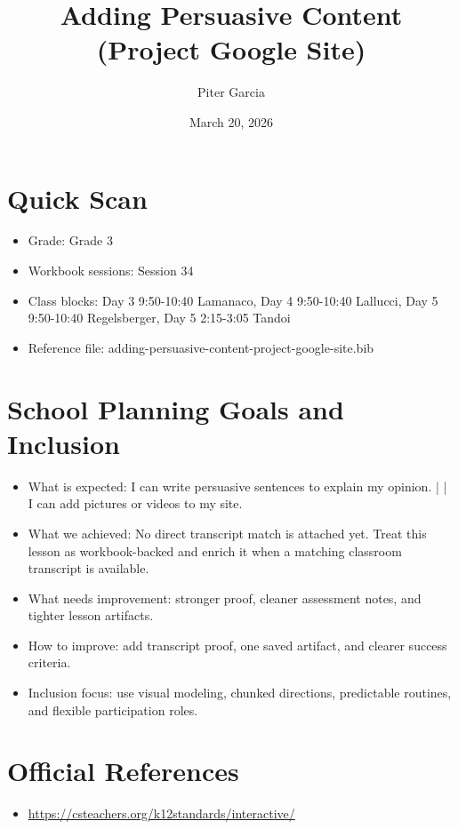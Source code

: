 \documentclass[11pt]{article}
\title{Adding Persuasive Content (Project Google Site)}
\author{Piter Garcia}
\date{March 20, 2026}
\begin{document}
\maketitle
\section*{Quick Scan}
\begin{itemize}[leftmargin=*]
\item Grade: Grade 3
\item Workbook sessions: Session 34
\item Class blocks: Day 3 9:50-10:40 Lamanaco, Day 4 9:50-10:40 Lallucci, Day 5 9:50-10:40 Regelsberger, Day 5 2:15-3:05 Tandoi
\item Reference file: adding-persuasive-content-project-google-site.bib
\end{itemize}
\section*{School Planning Goals and Inclusion}
\begin{itemize}[leftmargin=*]
\item What is expected: I can write persuasive sentences to explain my opinion. | | I can add pictures or videos to my site.
\item What we achieved: No direct transcript match is attached yet. Treat this lesson as workbook-backed and enrich it when a matching classroom transcript is available.
\item What needs improvement: stronger proof, cleaner assessment notes, and tighter lesson artifacts.
\item How to improve: add transcript proof, one saved artifact, and clearer success criteria.
\item Inclusion focus: use visual modeling, chunked directions, predictable routines, and flexible participation roles.
\end{itemize}
\section*{Official References}
\begin{itemize}[leftmargin=*]
\item \url{https://csteachers.org/k12standards/interactive/}

\end{itemize}
\end{document}
